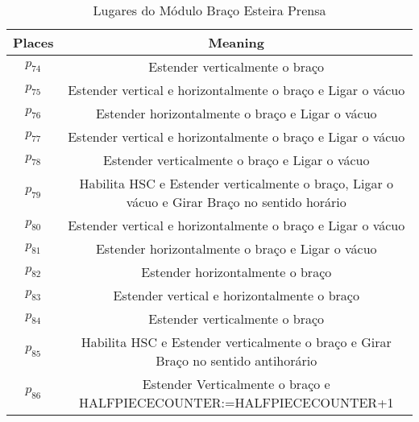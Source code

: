 \begin{table}[htbp]
\caption{Lugares do Módulo Braço Esteira Prensa}
\centering
\begin{tabular}{c|c}
Places & Meaning\\
\hline
\hyperlink{partialNet:p74}{\hypertarget{partialTable:p74}{$p_{74}$}} & Estender verticalmente o braço\\
\hyperlink{partialNet:p75}{\hypertarget{partialTable:p75}{$p_{75}$}} & Estender vertical e horizontalmente o braço e Ligar o vácuo\\
\hyperlink{partialNet:p76}{\hypertarget{partialTable:p76}{$p_{76}$}} & Estender horizontalmente o braço e Ligar o vácuo\\
\hyperlink{partialNet:p77}{\hypertarget{partialTable:p77}{$p_{77}$}} & Estender vertical e horizontalmente o braço e Ligar o vácuo\\
\hyperlink{partialNet:p78}{\hypertarget{partialTable:p78}{$p_{78}$}} & Estender verticalmente o braço e Ligar o vácuo\\
\hyperlink{partialNet:p79}{\hypertarget{partialTable:p79}{$p_{79}$}} & Habilita HSC e Estender verticalmente o braço, Ligar o vácuo e Girar Braço no sentido horário\\
\hyperlink{partialNet:p80}{\hypertarget{partialTable:p80}{$p_{80}$}} & Estender vertical e horizontalmente o braço e Ligar o vácuo\\
\hyperlink{partialNet:p81}{\hypertarget{partialTable:p81}{$p_{81}$}} & Estender horizontalmente o braço e Ligar o vácuo\\
\hyperlink{partialNet:p82}{\hypertarget{partialTable:p82}{$p_{82}$}} & Estender horizontalmente o braço\\
\hyperlink{partialNet:p83}{\hypertarget{partialTable:p83}{$p_{83}$}} & Estender vertical e horizontalmente o braço\\
\hyperlink{partialNet:p84}{\hypertarget{partialTable:p84}{$p_{84}$}} & Estender verticalmente o braço\\
\hyperlink{partialNet:p85}{\hypertarget{partialTable:p85}{$p_{85}$}} & Habilita HSC e Estender verticalmente o braço e Girar Braço no sentido antihorário\\
\hyperlink{partialNet:p86}{\hypertarget{partialTable:p86}{$p_{86}$}} & Estender Verticalmente o braço e HALFPIECECOUNTER:=HALFPIECECOUNTER+1\\
\end{tabular}
\end{table}

